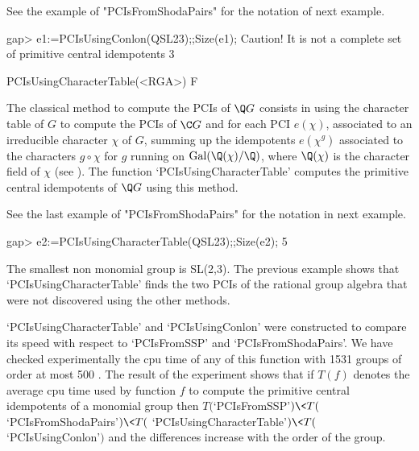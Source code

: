 See the example of "PCIsFromShodaPairs" for the notation of next example. 

\beginexample
    gap> e1:=PCIsUsingConlon(QSL23);;Size(e1);
    Caution! It is not a complete set of primitive central idempotents
    3
\endexample

\>PCIsUsingCharacterTable(<RGA>) F

The classical method to compute the PCIs of $\Q G$ consists in using the character 
table of $G$ to compute the PCIs of $\C G$ and for each PCI $e(\chi)$, associated to 
an irreducible character $\chi$ of $G$, summing up the idempotents $e(\chi^g)$ 
associated to the characters $g\circ \chi$ for $g$ running on ${\rm 
Gal}(\Q(\chi)/\Q)$, where $\Q(\chi)$ is the character field of $\chi$ (see 
\cite{Y}). The function `PCIsUsingCharacterTable' computes the primitive central 
idempotents of $\Q G$ using this method. 

See the last example of "PCIsFromShodaPairs" for the notation in next example. 

\beginexample
    gap> e2:=PCIsUsingCharacterTable(QSL23);;Size(e2);
    5
\endexample

The smallest non monomial group is SL(2,3). The previous example shows that 
`PCIsUsingCharacterTable' finds the two PCIs of the rational group algebra that were 
not discovered using the other methods. 

`PCIsUsingCharacterTable' and `PCIsUsingConlon' were constructed to compare its speed with 
respect to `PCIsFromSSP' and `PCIsFromShodaPairs'. We have checked experimentally the cpu time 
of any of this function with 1531 groups of order at most 500 \cite{OR}. The result of the 
experiment shows that if $T(f)$ denotes the average cpu time used by function $f$ to compute 
the primitive central idempotents of a monomial group then $T($`PCIsFromSSP'$)\<T($ 
`PCIsFromShodaPairs'$)\<T($ `PCIsUsingCharacterTable'$)\<T($ `PCIsUsingConlon'$)$ and the 
differences increase with the order of the group.
